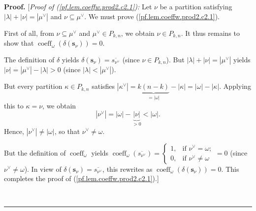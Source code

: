 \documentclass[numbers=enddot,12pt,final,onecolumn,notitlepage]{scrartcl}%
\theoremstyle{definition}
\newenvironment{proof}[1][Proof]{\noindent\textbf{#1.} }{\ \rule{0.5em}{0.5em}}
\begin{document}
\begin{proof}
[\textit{Proof of (\ref{pf.lem.coeffw.prod2.c2.1}):} Let $\nu$ be a partition
satisfying $\left\vert \lambda\right\vert +\left\vert \nu\right\vert
=\left\vert \mu^{\vee}\right\vert $ and $\nu\subseteq\mu^{\vee}$. We must
prove (\ref{pf.lem.coeffw.prod2.c2.1}).

First of all, from $\nu\subseteq\mu^{\vee}$ and $\mu^{\vee}\in P_{k,n}$, we
obtain $\nu\in P_{k,n}$. It thus remains to show that $\operatorname*{coeff}%
\nolimits_{\omega}\left(  \delta\left(  \mathbf{s}_{\nu}\right)  \right)  =0$.

The definition of $\delta$ yields $\delta\left(  \mathbf{s}_{\nu}\right)
=\overline{s_{\nu^{\vee}}}$ (since $\nu\in P_{k,n}$). But $\left\vert
\lambda\right\vert +\left\vert \nu\right\vert =\left\vert \mu^{\vee
}\right\vert $ yields $\left\vert \nu\right\vert =\left\vert \mu^{\vee
}\right\vert -\left\vert \lambda\right\vert >0$ (since $\left\vert
\lambda\right\vert <\left\vert \mu^{\vee}\right\vert $).

But every partition $\kappa\in P_{k,n}$ satisfies $\left\vert \kappa^{\vee
}\right\vert =\underbrace{k\left(  n-k\right)  }_{=\left\vert \omega
\right\vert }-\left\vert \kappa\right\vert =\left\vert \omega\right\vert
-\left\vert \kappa\right\vert $. Applying this to $\kappa=\nu$, we obtain
\[
\left\vert \nu^{\vee}\right\vert =\left\vert \omega\right\vert
-\underbrace{\left\vert \nu\right\vert }_{>0}<\left\vert \omega\right\vert .
\]
Hence, $\left\vert \nu^{\vee}\right\vert \neq\left\vert \omega\right\vert $,
so that $\nu^{\vee}\neq\omega$.

But the definition of $\operatorname*{coeff}\nolimits_{\omega}$ yields
$\operatorname*{coeff}\nolimits_{\omega}\left(  \overline{s_{\nu^{\vee}}%
}\right)  =%
\begin{cases}
1, & \text{if }\nu^{\vee}=\omega;\\
0, & \text{if }\nu^{\vee}\neq\omega
\end{cases}
=0$ (since $\nu^{\vee}\neq\omega$). In view of $\delta\left(  \mathbf{s}_{\nu
}\right)  =\overline{s_{\nu^{\vee}}}$, this rewrites as $\operatorname*{coeff}%
\nolimits_{\omega}\left(  \delta\left(  \mathbf{s}_{\nu}\right)  \right)  =0$.
This completes the proof of (\ref{pf.lem.coeffw.prod2.c2.1}).]


\end{proof}
\end{document}
